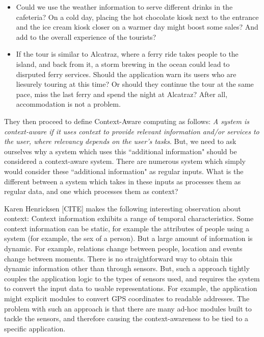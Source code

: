 \begin{itemize}
\item Could we use the weather information to serve different drinks in the cafeteria? On a cold day, placing the hot chocolate kiosk next to the entrance and the ice cream kiosk closer on a warmer day might boost some sales? And add to the overall experience of the tourists?
\item If the tour is similar to Alcatraz, where a ferry ride takes people to the island, and back from it, a storm brewing in the ocean could lead to disrputed ferry services. Should the application warn its users who are liesurely touring at this time? Or should they continue the tour at the same pace, miss the last ferry and spend the night at Alcatraz? After all, accommodation is not a problem.
\end{itemize}

They then proceed to define Context-Aware computing as follows: \textit{A system is context-aware if it uses context to provide relevant information and/or services to the user, where relevancy depends on the user's tasks}. But, we need to ask ourselves why a system which uses this ``additional information" should be considered a context-aware system. There are numerous system which simply would consider these ``additional information" as regular inputs. What is the different between a system which takes in these inputs as processes them as regular data, and one which processes them as context?

Karen Henricksen [CITE] makes the following interesting observation about context: Context information exhibits a range of temporal characteristics. Some context information can be static, for example the attributes of people using a system (for example, the sex of a person). But a large amount of information is dynamic. For example, relations change between people, location and events change between moments. There is no straightforward way to obtain this dynamic information other than through sensors. But, such a approach tightly couples the application logic to the types of sensors used, and requires the system to convert the input data to usable representations. For example, the application might explicit modules to convert GPS coordinates to readable addresses. The problem with such an approach is that there are many ad-hoc modules built to tackle the sensors, and therefore causing the context-awareness to be tied to a specific application.

